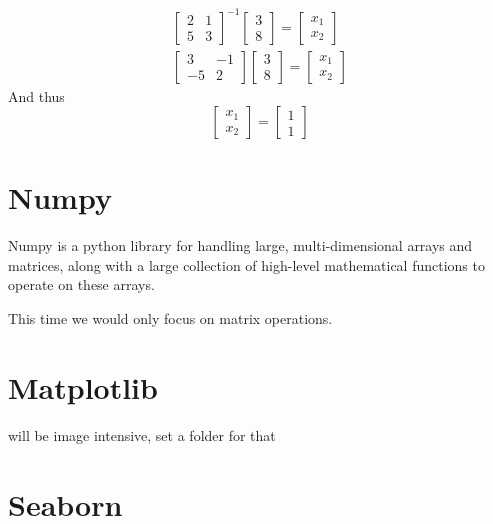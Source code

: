 \begin{equation}
	\begin{aligned}
	\begin{bmatrix}
		2&1\\
		5&3
	\end{bmatrix}^{-1}
	\begin{bmatrix}
		3\\
		8 
	\end{bmatrix}
	=
	\begin{bmatrix}
	x_1\\
	x_2 
	\end{bmatrix}\\
	\begin{bmatrix}
		3&-1\\
		-5&2
	\end{bmatrix}
	\begin{bmatrix}
		3\\
		8 
	\end{bmatrix}
	=
	\begin{bmatrix}
		x_1\\
		x_2 
	\end{bmatrix}
	\end{aligned}
\end{equation}
\noindent And thus
\begin{equation}
	\begin{bmatrix}
		x_1\\
		x_2 
	\end{bmatrix}
	=
	\begin{bmatrix}
		1\\
		1 
	\end{bmatrix}
\end{equation}
\section{Numpy}
Numpy is a python library for handling large, multi-dimensional arrays and matrices, along with a large collection of high-level mathematical functions to operate on these arrays.

\noindent This time we would only focus on matrix operations.
\section{Matplotlib}
will be image intensive, set a folder for that
\section{Seaborn}